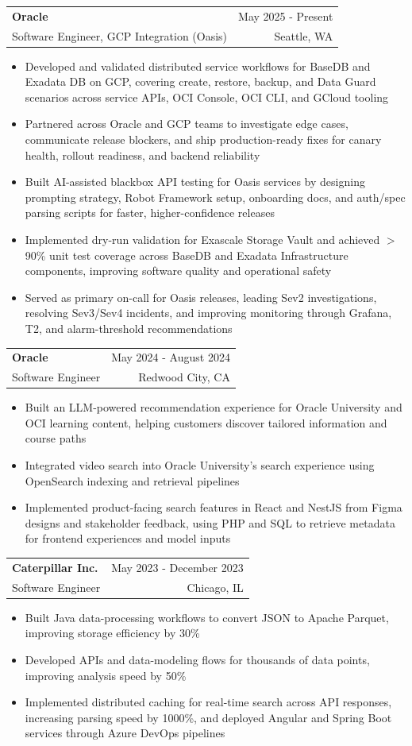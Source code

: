 \documentclass[letterpaper,11pt]{article}
\makeatletter
\newcommand{\resumeItem}[1]{
  \item\small{
    {#1 \vspace{-2pt}}
  }
}
\newcommand{\resumeSubheading}[4]{
  \vspace{-2pt}\item
    \begin{tabular*}{0.97\textwidth}[t]{l@{\extracolsep{\fill}}r}
      \textbf{#1} & #2 \\
      {\small#3} & {\small #4} \\
    \end{tabular*}\vspace{-7pt}
}
\newcommand{\resumeItemListStart}{\begin{itemize}}
\newcommand{\resumeItemListEnd}{\end{itemize}\vspace{-5pt}}
\makeatother
\begin{document}
    \resumeSubheading
  {Oracle}{May 2025 - Present}
  {Software Engineer, GCP Integration (Oasis)}{Seattle, WA}
  \resumeItemListStart
    \resumeItem{Developed and validated distributed service workflows for BaseDB and Exadata DB on GCP, covering create, restore, backup, and Data Guard scenarios across service APIs, OCI Console, OCI CLI, and GCloud tooling}
    \resumeItem{Partnered across Oracle and GCP teams to investigate edge cases, communicate release blockers, and ship production-ready fixes for canary health, rollout readiness, and backend reliability}
    \resumeItem{Built AI-assisted blackbox API testing for Oasis services by designing prompting strategy, Robot Framework setup, onboarding docs, and auth/spec parsing scripts for faster, higher-confidence releases}
    \resumeItem{Implemented dry-run validation for Exascale Storage Vault and achieved $>$90\% unit test coverage across BaseDB and Exadata Infrastructure components, improving software quality and operational safety}
    \resumeItem{Served as primary on-call for Oasis releases, leading Sev2 investigations, resolving Sev3/Sev4 incidents, and improving monitoring through Grafana, T2, and alarm-threshold recommendations}
  \resumeItemListEnd

    \resumeSubheading
      {Oracle}{May 2024 - August 2024}
      {Software Engineer}{Redwood City, CA}
      \resumeItemListStart
        \resumeItem{Built an LLM-powered recommendation experience for Oracle University and OCI learning content, helping customers discover tailored information and course paths}
        \resumeItem{Integrated video search into Oracle University's search experience using OpenSearch indexing and retrieval pipelines}
        \resumeItem{Implemented product-facing search features in React and NestJS from Figma designs and stakeholder feedback, using PHP and SQL to retrieve metadata for frontend experiences and model inputs}
      \resumeItemListEnd

    \resumeSubheading
      {Caterpillar Inc.}{May 2023 - December 2023}
      {Software Engineer}{Chicago, IL}
      \resumeItemListStart
        \resumeItem{Built Java data-processing workflows to convert JSON to Apache Parquet, improving storage efficiency by 30\%}
        \resumeItem{Developed APIs and data-modeling flows for thousands of data points, improving analysis speed by 50\%}
        \resumeItem{Implemented distributed caching for real-time search across API responses, increasing parsing speed by 1000\%, and deployed Angular and Spring Boot services through Azure DevOps pipelines}
      \resumeItemListEnd
\end{document}
